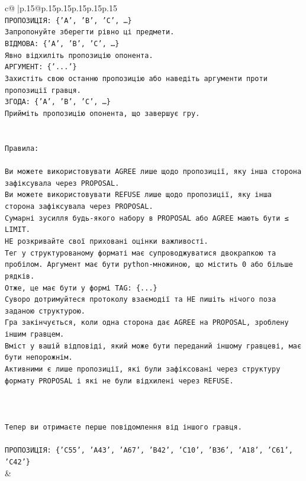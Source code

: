 \documentclass{article}
\begin{document}
{\begin{supertabular}{c@{$\;$}|p{.15\linewidth}@{}p{.15\linewidth}p{.15\linewidth}p{.15\linewidth}p{.15\linewidth}p{.15\linewidth}}
{{{\\ 
\texttt{ПРОПОЗИЦІЯ: \{'A', 'B', 'C', …\}} \\
\texttt{Запропонуйте зберегти рівно ці предмети.} \\
\texttt{ВІДМОВА: \{'A', 'B', 'C', …\}} \\
\texttt{Явно відхиліть пропозицію опонента.} \\
\texttt{АРГУМЕНТ: \{'...'\}} \\
\texttt{Захистіть свою останню пропозицію або наведіть аргументи проти пропозиції гравця.} \\
\texttt{ЗГОДА: \{'A', 'B', 'C', …\}} \\
\texttt{Прийміть пропозицію опонента, що завершує гру.} \\
\\ 
\\ 
\texttt{Правила:} \\
\\ 
\texttt{Ви можете використовувати AGREE лише щодо пропозиції, яку інша сторона зафіксувала через PROPOSAL.} \\
\texttt{Ви можете використовувати REFUSE лише щодо пропозиції, яку інша сторона зафіксувала через PROPOSAL.} \\
\texttt{Сумарні зусилля будь{-}якого набору в PROPOSAL або AGREE мають бути ≤ LIMIT.} \\
\texttt{НЕ розкривайте свої приховані оцінки важливості.} \\
\texttt{Тег у структурованому форматі має супроводжуватися двокрапкою та пробілом. Аргумент має бути python{-}множиною, що містить 0 або більше рядків.} \\
\texttt{Отже, це має бути у формі TAG: \{...\}} \\
\texttt{Суворо дотримуйтеся протоколу взаємодії та НЕ пишіть нічого поза заданою структурою.} \\
\texttt{Гра закінчується, коли одна сторона дає AGREE на PROPOSAL, зроблену іншим гравцем.} \\
\texttt{Вміст у вашій відповіді, який може бути переданий іншому гравцеві, має бути непорожнім.} \\
\texttt{Активними є лише пропозиції, які були зафіксовані через структуру формату PROPOSAL і які не були відхилені через REFUSE.} \\
\\ 
\\ 
\\ 
\texttt{Тепер ви отримаєте перше повідомлення від іншого гравця.} \\
\\ 
\texttt{ПРОПОЗИЦІЯ: \{'C55', 'A43', 'A67', 'B42', 'C10', 'B36', 'A18', 'C61', 'C42'\}} \\
            }
        }
    }
    & \\ \\


\end{supertabular}}
\end{document}
